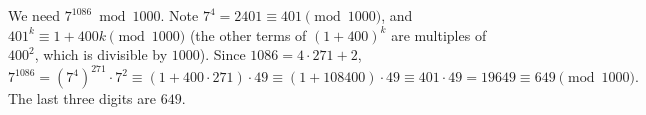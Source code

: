 We need $7^{1086}\bmod1000$. Note $7^4=2401\equiv401\pmod{1000}$, and $401^k\equiv1+400k\pmod{1000}$ (the other terms of $(1+400)^k$ are multiples of $400^2$, which is divisible by $1000$). Since $1086=4\cdot271+2$,
\[7^{1086}=\left(7^4\right)^{271}\cdot7^2\equiv(1+400\cdot271)\cdot49\equiv(1+108400)\cdot49\equiv401\cdot49=19649\equiv649\pmod{1000}.\]
The last three digits are $\boxed{649}$.
